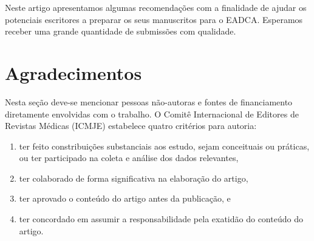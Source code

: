\documentclass[11pt]{article}
\begin{document}
Neste artigo apresentamos algumas recomendações com a finalidade de
ajudar os potenciais escritores a preparar os seus manuscritos para o
EADCA. Esperamos receber uma grande quantidade de submissões com
qualidade.

\section*{Agradecimentos}

Nesta seção deve-se mencionar pessoas não-autoras e fontes de
financiamento diretamente envolvidas com o trabalho. O Comitê
Internacional de Editores de Revistas Médicas (ICMJE) estabelece
quatro critérios para autoria:
\begin{enumerate}
\item ter feito constribuições substanciais aos estudo, sejam conceituais
  ou práticas, ou ter participado na coleta e análise dos dados relevantes,
\item ter colaborado de forma significativa na elaboração do artigo,
\item ter aprovado o conteúdo do artigo antes da publicação, e
\item ter concordado em assumir a responsabilidade pela exatidão do conteúdo do artigo.
\end{enumerate}



\vspace{0.1cm}
\end{document}
